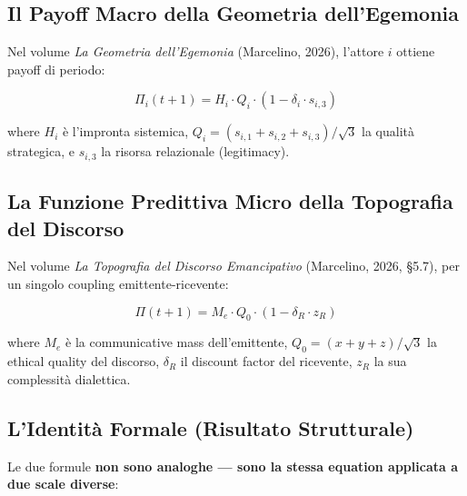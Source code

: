 \subsection{Il Payoff Macro della Geometria
dell'Egemonia}\label{il-payoff-macro-della-geometria-dellegemonia}

Nel volume \emph{La Geometria dell'Egemonia} (Marcelino, 2026), l'attore
\(i\) ottiene payoff di periodo:

\[
\Pi_i(t+1) = H_i \cdot Q_i \cdot (1 - \delta_i \cdot s_{i,3})
\]

where \(H_i\) è l'impronta sistemica,
\(Q_i = (s_{i,1}+s_{i,2}+s_{i,3})/\sqrt{3}\) la qualità strategica, e
\(s_{i,3}\) la risorsa relazionale (legitimacy).

\subsection{La Funzione Predittiva Micro della Topografia del
Discorso}\label{la-funzione-predittiva-micro-della-topografia-del-discorso}

Nel volume \emph{La Topografia del Discorso Emancipativo} (Marcelino,
2026, \S{}5.7), per un singolo coupling emittente-ricevente:

\[
\Pi(t+1) = M_e \cdot Q_0 \cdot (1 - \delta_R \cdot z_R)
\]

where \(M_e\) è la communicative mass dell'emittente,
\(Q_0 = (x+y+z)/\sqrt{3}\) la ethical quality del discorso, \(\delta_R\)
il discount factor del ricevente, \(z_R\) la sua complessità
dialettica.

\subsection{\texorpdfstring{\Proved{} L'Identità Formale (Risultato
Strutturale)}{ L'Identità Formale (Risultato Strutturale)}}\label{lidentituxe0-formal-risultato-structural}

Le due formule \textbf{non sono analoghe --- sono la stessa equation
applicata a due scale diverse}:

